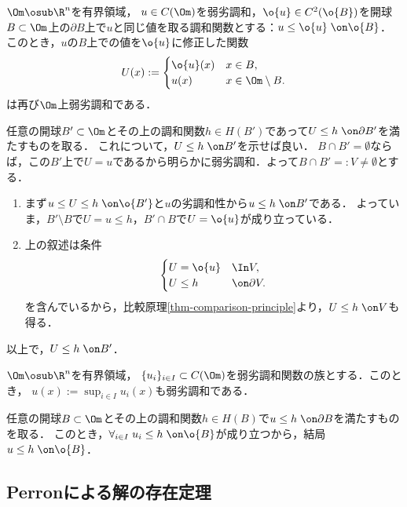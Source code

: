 \documentclass[uplatex,dvipdfmx]{jsreport}
\begin{document}
\begin{proposition}
    $\Om\osub\R^n$を有界領域，
    $u\in C(\Om)$を弱劣調和，$\o{u}\in C^2(\o{B})$を開球$B\subset\Om$上の$\partial B$上で$u$と同じ値を取る調和関数とする：$u\le\o{u}\;\on\o{B}$．
    このとき，$u$の$B$上での値を$\o{u}$に修正した関数
    \[U(x):=\begin{cases}
        \o{u}(x)&x\in B,\\
        u(x)&x\in\Om\setminus B.
    \end{cases}\]
    は再び$\Om$上弱劣調和である．
\end{proposition}
\begin{Proof}
    任意の開球$B'\subset\Om$とその上の調和関数$h\in H(B')$であって$U\le h\;\on\partial B'$を満たすものを取る．
    これについて，$U\le h\;\on B'$を示せば良い．
    $B\cap B'=\emptyset$ならば，この$B'$上で$U=u$であるから明らかに弱劣調和．よって$B\cap B'=:V\ne\emptyset$とする．
    \begin{enumerate}
        \item まず$u\le U\le h\;\on\o{B'}$と$u$の劣調和性から$u\le h\;\on B'$である．
        よっていま，$B'\setminus B$で$U=u\le h$，$B'\cap B$で$U=\o{u}$が成り立っている．
        \item 上の叙述は条件
        \[\begin{cases}
            U=\o{u}&\In V,\\
            U\le h&\on\partial V.
        \end{cases}\]
        を含んでいるから，比較原理\ref{thm-comparison-principle}より，$U\le h\;\on V$も得る．
    \end{enumerate}
    以上で，$U\le h\;\on B'$．
\end{Proof}

\begin{corollary}
    $\Om\osub\R^n$を有界領域，
    $\{u_i\}_{i\in I}\subset C(\Om)$を弱劣調和関数の族とする．このとき，
    $u(x):=\sup_{i\in I}u_i(x)$も弱劣調和である．
\end{corollary}
\begin{Proof}
    任意の開球$B\subset\Om$とその上の調和関数$h\in H(B)$で$u\le h\;\on\partial B$を満たすものを取る．
    このとき，$\forall_{i\in I}\;u_i\le h\;\on\o{B}$が成り立つから，結局$u\le h\;\on\o{B}$．
\end{Proof}

\subsection{Perronによる解の存在定理}
\end{document}
